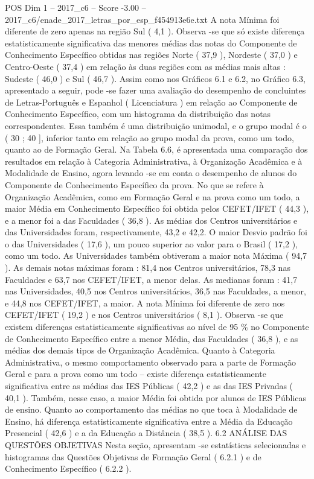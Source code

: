\begin{textsample}{POS Dim 1 – 2017\_c6 – Score -3.00 – 2017\_c6/enade\_2017\_letras\_por\_esp\_f454913e6e.txt}
A nota Mínima foi diferente de zero apenas na região Sul ( 4,1 ).
Observa -se que só existe diferença estatisticamente significativa das menores médias das notas do Componente de Conhecimento Específico obtidas nas regiões Norte ( 37,9 ), Nordeste ( 37,0 ) e Centro-Oeste ( 37,4 ) em relação às duas regiões com as médias mais altas : Sudeste ( 46,0 ) e Sul ( 46,7 ).
Assim como nos Gráficos 6.1 e 6.2, no Gráfico 6.3, apresentado a seguir, pode -se fazer uma avaliação do desempenho de concluintes de Letras-Português e Espanhol ( Licenciatura ) em relação ao Componente de Conhecimento Específico, com um histograma da distribuição das notas correspondentes.
Essa também é uma distribuição unimodal, e o grupo modal é o ( 30 ; 40 ], inferior tanto em relação ao grupo modal da prova, como um todo, quanto ao de Formação Geral.
Na Tabela 6.6, é apresentada uma comparação dos resultados em relação à Categoria Administrativa, à Organização Acadêmica e à Modalidade de Ensino, agora levando -se em conta o desempenho de alunos do Componente de Conhecimento Específico da prova.
No que se refere à Organização Acadêmica, como em Formação Geral e na prova como um todo, a maior Média em Conhecimento Específico foi obtida pelos CEFET/IFET ( 44,3 ), e a menor foi a das Faculdades ( 36,8 ).
As médias dos Centros universitários e das Universidades foram, respectivamente, 43,2 e 42,2.
O maior Desvio padrão foi o das Universidades ( 17,6 ), um pouco superior ao valor para o Brasil ( 17,2 ), como um todo.
As Universidades também obtiveram a maior nota Máxima ( 94,7 ).
As demais notas máximas foram : 81,4 nos Centros universitários, 78,3 nas Faculdades e 63,7 nos CEFET/IFET, a menor delas.
As medianas foram : 41,7 nas Universidades, 40,5 nos Centros universitários, 36,5 nas Faculdades, a menor, e 44,8 nos CEFET/IFET, a maior.
A nota Mínima foi diferente de zero nos CEFET/IFET ( 19,2 ) e nos Centros universitários ( 8,1 ).
Observa -se que existem diferenças estatisticamente significativas ao nível de 95 \% no Componente de Conhecimento Específico entre a menor Média, das Faculdades ( 36,8 ), e as médias dos demais tipos de Organização Acadêmica.
Quanto à Categoria Administrativa, o mesmo comportamento observado para a parte de Formação Geral e para a prova como um todo – existe diferença estatisticamente significativa entre as médias das IES Públicas ( 42,2 ) e as das IES Privadas ( 40,1 ).
Também, nesse caso, a maior Média foi obtida por alunos de IES Públicas de ensino.
Quanto ao comportamento das médias no que toca à Modalidade de Ensino, há diferença estatisticamente significativa entre a Média da Educação Presencial ( 42,6 ) e a da Educação a Distância ( 38,5 ). 6.2 ANÁLISE DAS QUESTÕES OBJETIVAS Nesta seção, apresentam -se estatísticas selecionadas e histogramas das Questões Objetivas de Formação Geral ( 6.2.1 ) e de Conhecimento Específico ( 6.2.2 ).

\end{textsample}
